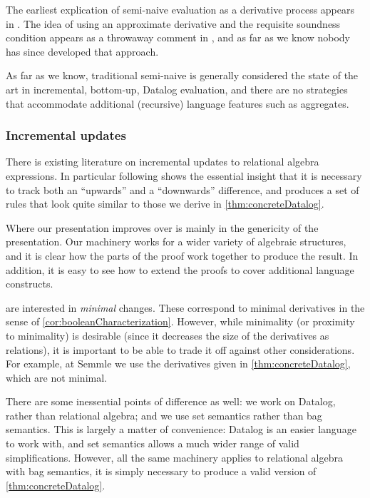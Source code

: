 The earliest explication of semi-naive evaluation as a derivative process
appears in \textcite{bancilhon1986naive}. The idea of using an approximate derivative
and the requisite soundness condition appears as a throwaway comment in
\textcite[][section 3.2.2]{bancilhon1986amateur}, and as far as we know nobody has since
developed that approach. 

As far as we know, traditional semi-naive is generally considered the state of
the art in incremental, bottom-up, Datalog evaluation, and there are no strategies that
accommodate additional (recursive) language features such as aggregates.

\subsubsection{Incremental updates}

There is existing literature on incremental updates to relational algebra
expressions. In particular \textcite{griffin1997improved} following
\textcite{qian1991incremental} shows the essential insight that it is necessary to
track both an ``upwards'' and a ``downwards'' difference, and produces a set of
rules that look quite similar to those we derive in \cref{thm:concreteDatalog}.

Where our presentation improves over \citeauthor{griffin1997improved} is mainly in
the genericity of the presentation. Our machinery works for a wider variety of
algebraic structures, and it is clear how the parts of the proof work together
to produce the result. In addition, it is easy to see how to extend the proofs
to cover additional language constructs.

\citeauthor{griffin1997improved} are interested in \emph{minimal} changes. These correspond to
minimal derivatives in the sense of \cref{cor:booleanCharacterization}. However,
while minimality (or proximity to minimality) is desirable (since it decreases
the size of the derivatives as relations), it is important to be able to trade
it off against other considerations. For example, at
Semmle we use the derivatives given in \cref{thm:concreteDatalog}, which are not minimal.

There are some inessential points of difference as well: we work on Datalog,
rather than relational algebra; and we use set semantics rather than bag
semantics. This is largely a matter of convenience: Datalog is an easier
language to work with, and set semantics allows a much wider range of valid
simplifications. However, all the same machinery applies to relational algebra
with bag semantics, it is simply necessary to produce a valid version of \cref{thm:concreteDatalog}.

